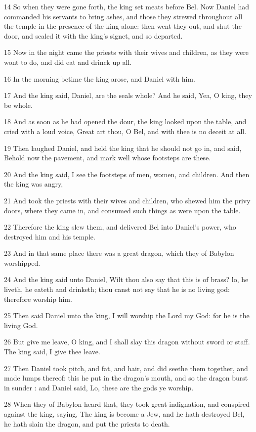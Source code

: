 \par 14 So when they were gone forth, the king set meats before Bel. Now Daniel had commanded his servants to bring ashes, and those they strewed throughout all the temple in the presence of the king alone: then went they out, and shut the door, and sealed it with the king's signet, and so departed.
\par 15 Now in the night came the priests with their wives and children, as they were wont to do, and did eat and drinck up all.
\par 16 In the morning betime the king arose, and Daniel with him.
\par 17 And the king said, Daniel, are the seals whole? And he said, Yea, O king, they be whole.
\par 18 And as soon as he had opened the dour, the king looked upon the table, and cried with a loud voice, Great art thou, O Bel, and with thee is no deceit at all.
\par 19 Then laughed Daniel, and held the king that he should not go in, and said, Behold now the pavement, and mark well whose footsteps are these.
\par 20 And the king said, I see the footsteps of men, women, and children. And then the king was angry,
\par 21 And took the priests with their wives and children, who shewed him the privy doors, where they came in, and consumed such things as were upon the table.
\par 22 Therefore the king slew them, and delivered Bel into Daniel's power, who destroyed him and his temple.
\par 23 And in that same place there was a great dragon, which they of Babylon worshipped.
\par 24 And the king said unto Daniel, Wilt thou also say that this is of brass? lo, he liveth, he eateth and drinketh; thou canst not say that he is no living god: therefore worship him.
\par 25 Then said Daniel unto the king, I will worship the Lord my God: for he is the living God.
\par 26 But give me leave, O king, and I shall slay this dragon without sword or staff. The king said, I give thee leave.
\par 27 Then Daniel took pitch, and fat, and hair, and did seethe them together, and made lumps thereof: this he put in the dragon's mouth, and so the dragon burst in sunder : and Daniel said, Lo, these are the gods ye worship.
\par 28 When they of Babylon heard that, they took great indignation, and conspired against the king, saying, The king is become a Jew, and he hath destroyed Bel, he hath slain the dragon, and put the priests to death.
